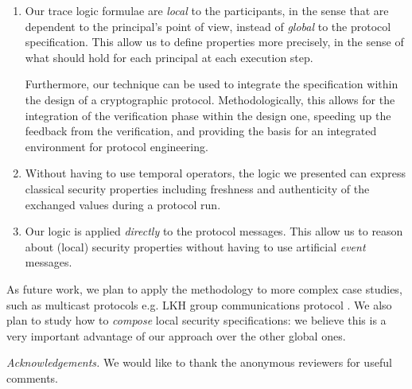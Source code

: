 \documentclass{entcs} \usepackage{entcsmacro}
\begin{document}
\begin{enumerate}

\item Our trace logic formulae are \emph{local} to the participants,
in the sense that are dependent to the principal's point of view,
instead of \emph{global} to the protocol specification. This allow us
to define properties more precisely, in the sense of what should hold
for each principal at each execution step.

Furthermore, our technique can be used to integrate the specification
within the design of a cryptographic protocol. Methodologically, this
allows for the integration of the verification phase within the design
one, speeding up the feedback from the verification, and providing the
basis for an integrated environment for protocol engineering.

\item Without having to use temporal operators, the logic we presented can 
express classical security properties including freshness and
authenticity of the exchanged values during a protocol run.

\item Our logic is applied \emph{directly} to the protocol messages.
This allow us to reason about (local) security properties without
having to use artificial \emph{event} messages.

\end{enumerate}

As future work, we plan to apply the methodology to more complex case
studies, such as multicast protocols e.g. LKH group communications
protocol \cite{LKH}. We also plan to study how to \emph{compose} local
security specifications: we believe this is a very important advantage
of our approach over the other global ones.

\emph{Acknowledgements.}
We would like to thank the anonymous reviewers for useful comments.

%
%
\end{document}
